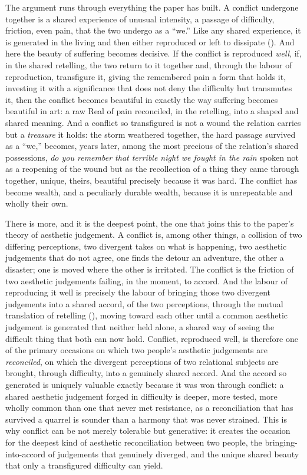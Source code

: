 The argument runs through everything the paper has built. A conflict undergone together is a shared experience of unusual intensity, a passage of difficulty, friction, even pain, that the two undergo as a ``we.'' Like any shared experience, it is generated in the living and then either reproduced or left to dissipate (). And here the beauty of suffering becomes decisive. If the conflict is reproduced \emph{well}, if, in the shared retelling, the two return to it together and, through the labour of reproduction, transfigure it, giving the remembered pain a form that holds it, investing it with a significance that does not deny the difficulty but transmutes it, then the conflict becomes beautiful in exactly the way suffering becomes beautiful in art: a raw Real of pain reconciled, in the retelling, into a shaped and shared meaning. And a conflict so transfigured is not a wound the relation carries but a \emph{treasure} it holds: the storm weathered together, the hard passage survived as a ``we,'' becomes, years later, among the most precious of the relation's shared possessions, \emph{do you remember that terrible night we fought in the rain} spoken not as a reopening of the wound but as the recollection of a thing they came through together, unique, theirs, beautiful precisely because it was hard. The conflict has become wealth, and a peculiarly durable wealth, because it is unrepeatable and wholly their own.

There is more, and it is the deepest point, the one that joins this to the paper's theory of aesthetic judgement. A conflict is, among other things, a collision of two differing perceptions, two divergent takes on what is happening, two aesthetic judgements that do not agree, one finds the detour an adventure, the other a disaster; one is moved where the other is irritated. The conflict is the friction of two aesthetic judgements failing, in the moment, to accord. And the labour of reproducing it well is precisely the labour of bringing those two divergent judgements into a shared accord, of the two perceptions, through the mutual translation of retelling (), moving toward each other until a common aesthetic judgement is generated that neither held alone, a shared way of seeing the difficult thing that both can now hold. Conflict, reproduced well, is therefore one of the primary occasions on which two people's aesthetic judgements are \emph{reconciled}, on which the divergent perceptions of two relational subjects are brought, through difficulty, into a genuinely shared accord. And the accord so generated is uniquely valuable exactly because it was won through conflict: a shared aesthetic judgement forged in difficulty is deeper, more tested, more wholly common than one that never met resistance, as a reconciliation that has survived a quarrel is sounder than a harmony that was never strained. This is why conflict can be not merely tolerable but generative: it creates the occasion for the deepest kind of aesthetic reconciliation between two people, the bringing-into-accord of judgements that genuinely diverged, and the unique shared beauty that only a transfigured difficulty can yield.

